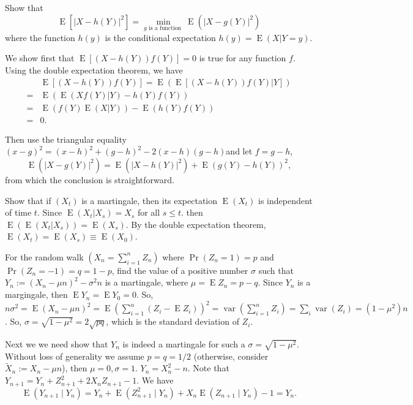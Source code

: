 \documentclass[  11pt]{article}
\newcommand{\optional}{ {\it optional} }
\newcommand{\p}{ {\Pr}}
\newcommand{\e}{ \operatorname{E}}
\newcommand{\Var}{\operatorname{var}}
\begin{document}
\begin{ExerciseList}
 

\Exercise[difficulty=5]

Show that 
\[\e [ |X-h(Y)|^2] =\min_{g \mbox{ is a function }}  \e (  |X-g(Y)|^2    ) \]
where the function  $h(y)$ is the conditional expectation  $h(y)=\e(X|Y=y)$.

\Answer
We show first that   $\e[(X-h(Y) )  f(Y) ]=0$ is true  for any function $f$.
Using the double expectation theorem, we have 
\[
\begin{split}
&\e[(X-h(Y) )  f(Y) ] = \e ( \e[(X-h(Y) )  f(Y) | Y  ]  )\\
=& \e ( \e(Xf(Y)|Y) -h(Y)   f(Y))   \\
= &\e ( f(Y) \e(X|Y))  -\e(h(Y)   f(Y)   )\\
=&0.
\end{split}
\]


 Then use the triangular equality
$(x-g)^2=(x-h)^2+(g-h)^2-2(x-h)(g-h)$and let $f=g-h$,
\[\e (  |X-g(Y)|^2    )
=\e (  |X-h(Y)|^2   ) + \e(g(Y)-h(Y))^2,\]
from which the conclusion is straightforward.



\Exercise[name =\optional]
Show that if $(X_t)$ is a martingale, then 
its expectation $\e(X_t)$ is independent of time $t$. 
\Answer
Since $\e(X_t|X_s) = X_s$ for all $s\leq t$. then
$\e(\e(X_t|X_s))=\e(X_s)$. By the double expectation theorem, 
$\e(X_t)=\e(X_s)\equiv \e(X_0)$.

\Exercise [name=\optional, difficulty=4]
 For the random walk  $(X_n=\sum_{i=1}^n Z_n)$
 where $\p(Z_n=1)=p$ and $\p(Z_n=-1)=q=1-p$, find the value 
of a positive number $\sigma$
such that $Y_n:=(X_n-\mu n)^2 -\sigma^2 n $ is a martingale,
where $\mu=\e Z_n =p-q$.
\Answer
Since $Y_n$ is a margingale, then
$\e Y_n=\e Y_0=0$. So,
$n \sigma^2 = \e (X_n-\mu n)^2= \e (\sum_{i=1}^n  (Z_i - \e Z_i))^2
=\Var(\sum_{i=1}^n Z_i)=\sum_i \Var(Z_i)=
(1-\mu^2)n$.
So, $\sigma=\sqrt{1-\mu^2}=2\sqrt{pq}$, which is the standard deviation of 
$Z_i$.

Next we we need show that $Y_n$ is indeed a martingale for such a 
$\sigma=\sqrt{1-\mu^2}$.
Without loss of generality we assume $p=q=1/2$ (otherwise, consider $\widetilde{X}_n:=X_n-\mu n$), then $\mu=0,\sigma=1$.
$Y_n=X_n^2-n$. Note that $Y_{n+1}=Y_n + Z_{n+1}^2 + 2 X_n Z_{n+1}-1$.
We have 
\[\e (Y_{n+1} \mid Y_n)=Y_n+ \e(Z_{n+1}^2\mid Y_n) + X_n \e(Z_{n+1}\mid Y_n) -1
=Y_n.\]


\end{ExerciseList}

\newpage
\end{document}
